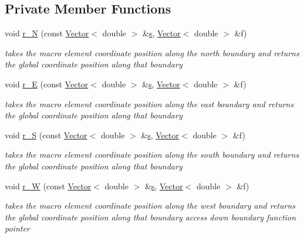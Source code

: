 \subsection*{Private Member Functions}
\begin{DoxyCompactItemize}
\item 
void \hyperlink{classoomph_1_1TopologicallyRectangularDomain_a6adb9d87f5dcedd2ede5a8da494930e5}{r\+\_\+N} (const \hyperlink{classoomph_1_1Vector}{Vector}$<$ double $>$ \&\hyperlink{cfortran_8h_ab7123126e4885ef647dd9c6e3807a21c}{s}, \hyperlink{classoomph_1_1Vector}{Vector}$<$ double $>$ \&f)
\begin{DoxyCompactList}\small\item\em takes the macro element coordinate position along the north boundary and returns the global coordinate position along that boundary \end{DoxyCompactList}\item 
void \hyperlink{classoomph_1_1TopologicallyRectangularDomain_a02ac630af43ddea871e5d9cf543d783b}{r\+\_\+E} (const \hyperlink{classoomph_1_1Vector}{Vector}$<$ double $>$ \&\hyperlink{cfortran_8h_ab7123126e4885ef647dd9c6e3807a21c}{s}, \hyperlink{classoomph_1_1Vector}{Vector}$<$ double $>$ \&f)
\begin{DoxyCompactList}\small\item\em takes the macro element coordinate position along the east boundary and returns the global coordinate position along that boundary \end{DoxyCompactList}\item 
void \hyperlink{classoomph_1_1TopologicallyRectangularDomain_a76ea308be7a90143fe728fc4799d584b}{r\+\_\+S} (const \hyperlink{classoomph_1_1Vector}{Vector}$<$ double $>$ \&\hyperlink{cfortran_8h_ab7123126e4885ef647dd9c6e3807a21c}{s}, \hyperlink{classoomph_1_1Vector}{Vector}$<$ double $>$ \&f)
\begin{DoxyCompactList}\small\item\em takes the macro element coordinate position along the south boundary and returns the global coordinate position along that boundary \end{DoxyCompactList}\item 
void \hyperlink{classoomph_1_1TopologicallyRectangularDomain_aa56f73a53b028997929605e71eab6e2d}{r\+\_\+W} (const \hyperlink{classoomph_1_1Vector}{Vector}$<$ double $>$ \&\hyperlink{cfortran_8h_ab7123126e4885ef647dd9c6e3807a21c}{s}, \hyperlink{classoomph_1_1Vector}{Vector}$<$ double $>$ \&f)
\begin{DoxyCompactList}\small\item\em takes the macro element coordinate position along the west boundary and returns the global coordinate position along that boundary access down boundary function pointer \end{DoxyCompactList}\item 

\end{DoxyCompactItemize}
